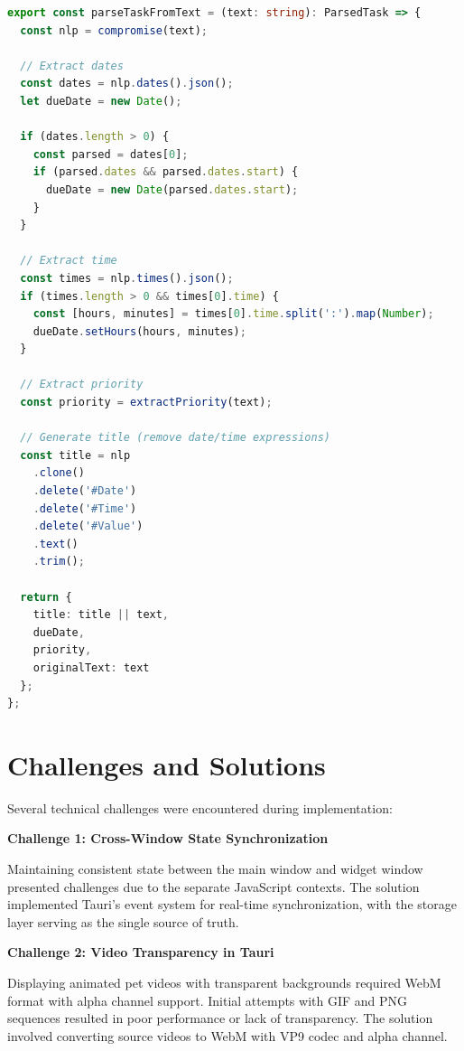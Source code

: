 \begin{lstlisting}[language=TypeScript, caption=NLP Parser Implementation]
export const parseTaskFromText = (text: string): ParsedTask => {
  const nlp = compromise(text);
  
  // Extract dates
  const dates = nlp.dates().json();
  let dueDate = new Date();
  
  if (dates.length > 0) {
    const parsed = dates[0];
    if (parsed.dates && parsed.dates.start) {
      dueDate = new Date(parsed.dates.start);
    }
  }
  
  // Extract time
  const times = nlp.times().json();
  if (times.length > 0 && times[0].time) {
    const [hours, minutes] = times[0].time.split(':').map(Number);
    dueDate.setHours(hours, minutes);
  }
  
  // Extract priority
  const priority = extractPriority(text);
  
  // Generate title (remove date/time expressions)
  const title = nlp
    .clone()
    .delete('#Date')
    .delete('#Time')
    .delete('#Value')
    .text()
    .trim();
  
  return {
    title: title || text,
    dueDate,
    priority,
    originalText: text
  };
};
\end{lstlisting}

\section{Challenges and Solutions}
\label{sec:challenges}

\completed

Several technical challenges were encountered during implementation:

\textbf{Challenge 1: Cross-Window State Synchronization}

Maintaining consistent state between the main window and widget window presented challenges due to the separate JavaScript contexts. The solution implemented Tauri's event system for real-time synchronization, with the storage layer serving as the single source of truth.

\textbf{Challenge 2: Video Transparency in Tauri}

Displaying animated pet videos with transparent backgrounds required WebM format with alpha channel support. Initial attempts with GIF and PNG sequences resulted in poor performance or lack of transparency. The solution involved converting source videos to WebM with VP9 codec and alpha channel.

